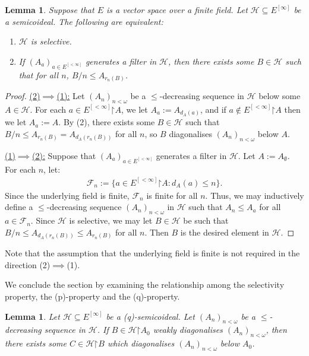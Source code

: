 \documentclass[11pt,reqno]{amsart}
\theoremstyle{plain}
\numberwithin{equation}{section}
\newtheorem{lemma}[theorem]{Lemma}
\theoremstyle{definition}
\newcommand{\F}{\cal{F}}
\newcommand{\cal}{\mathcal}
\newcommand{\restrictedto}{\mathord{\upharpoonright}}
\renewcommand{\H}{\cal{H}}
\begin{document}
\begin{lemma}
    Suppose that $E$ is a vector space over a finite field. Let $\H \subseteq E^{[\infty]}$ be a semicoideal. The following are equivalent:
    \begin{enumerate}
        \item $\H$ is selective.
        
        \item If $(A_a)_{a \in E^{[<\infty]}}$ generates a filter in $\H$, then there exists some $B \in \H$ such that for all $n$, $B/n \leq A_{r_n(B)}$. 
    \end{enumerate}
\end{lemma}

\begin{proof}
    \underline{(2)$\implies$(1):} Let $(A_n)_{n<\omega}$ be a $\leq$-decreasing sequence in $\H$ below some $A \in \H$. For each $a \in E^{[<\infty]}\restrictedto A$, we let $A_a := A_{d_A(a)}$, and if $a \notin E^{[<\infty]}\restrictedto A$ then we let $A_a := A$. By (2), there exists some $B \in \H$ such that $B/n \leq A_{r_n(B)} = A_{d_A(r_n(B))}$ for all $n$, so $B$ diagonalises $(A_n)_{n<\omega}$ below $A$. 

    \underline{(1)$\implies$(2):} Suppose that $(A_a)_{a \in E^{[<\infty]}}$ generates a filter in $\H$. Let $A := A_\emptyset$. For each $n$, let:
    \begin{align*}
        \F_n := \{a \in E^{[<\infty]}\restrictedto A : d_A(a) \leq n\}.
    \end{align*}
    Since the underlying field is finite, $\F_n$ is finite for all $n$. Thus, we may inductively define a $\leq$-decreasing sequence $(A_n)_{n<\omega}$ in $\H$ such that $A_n \leq A_a$ for all $a \in \F_n$. Since $\H$ is selective, we may let $B \in \H$ be such that $B/n \leq A_{d_A(r_n(B))} \leq A_{r_n(B)}$ for all $n$. Then $B$ is the desired element in $\H$.
\end{proof}

Note that the assumption that the underlying field is finite is not required in the direction (2)$\implies$(1).

We conclude the section by examining the relationship among the selectivity property, the (p)-property and the (q)-property.

\begin{lemma}
\label{lem:(q)-property.refines.diagonalisation}
    Let $\H \subseteq E^{[\infty]}$ be a (q)-semicoideal. Let $(A_n)_{n<\omega}$ be a $\leq$-decreasing sequence in $\H$. If $B \in \H\restrictedto A_0$ weakly diagonalises $(A_n)_{n<\omega}$, then there exists some $C \in \H\restrictedto B$ which diagonalises $(A_n)_{n<\omega}$ below $A_0$.
\end{lemma}
\end{document}
